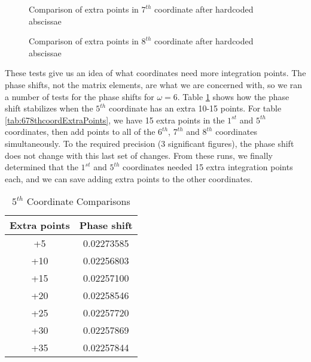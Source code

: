 \documentclass[Dissertation.tex]{subfiles}
\begin{document}
\begin{figure}[H]
\centering
{}
\caption{Comparison of extra points in $7^{th}$ coordinate after hardcoded abscissae}
\label{fig:PlusCoord7}
\end{figure}

\begin{figure}[H]
\centering
{}
\caption{Comparison of extra points in $8^{th}$ coordinate after hardcoded abscissae}
\label{fig:PlusCoord8}
\end{figure}

These tests give us an idea of what coordinates need more integration points. The phase shifts, not the matrix elements, are what we are concerned with, so we ran a number of tests for the phase shifts for $\omega = 6$. Table \ref{tab:5thcoordExtraPoints} shows how the phase shift stabilizes when the $5^{th}$ coordinate has an extra 10-15 points. For table \ref{tab:678thcoordExtraPoints}, we have 15 extra points in the $1^{st}$ and $5^{th}$ coordinates, then add points to all of the $6^{th}$, $7^{th}$ and $8^{th}$ coordinates simultaneously. To the required precision (3 significant figures), the phase shift does not change with this last set of changes. From these runs, we finally determined that the $1^{st}$ and $5^{th}$ coordinates needed 15 extra integration points each, and we can save adding extra points to the other coordinates.

\begin{table}[H]
\centering
\begin{tabular}{c c}
\toprule
Extra points & Phase shift \\
\midrule
+5 & 0.02273585 \\
+10 & 0.02256803 \\
+15 & 0.02257100 \\
+20 & 0.02258546 \\
+25 & 0.02257720 \\
+30 & 0.02257869 \\
+35 & 0.02257844 \\
\bottomrule
\end{tabular}
\caption{$5^{th}$ Coordinate Comparisons}
\label{tab:5thcoordExtraPoints}
\end{table}
\end{document}
